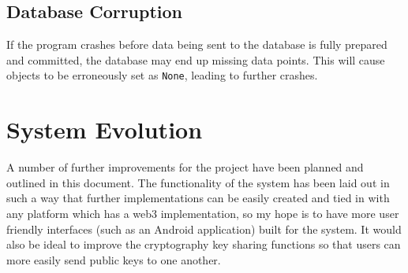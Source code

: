 \documentclass[titlepage]{report}
\begin{document}
\subsection{Database Corruption}
If the program crashes before data being sent to the database is fully prepared and committed, the database may end up missing data points. This will cause objects to be erroneously set as \texttt{None}, leading to further crashes.

\section{System Evolution}
A number of further improvements for the project have been planned and outlined in this document. The functionality of the system has been laid out in such a way that further implementations can be easily created and tied in with any platform which has a web3 implementation, so my hope is to have more user friendly interfaces (such as an Android application) built for the system. It would also be ideal to improve the cryptography key sharing functions so that users can more easily send public keys to one another.
\end{document}

